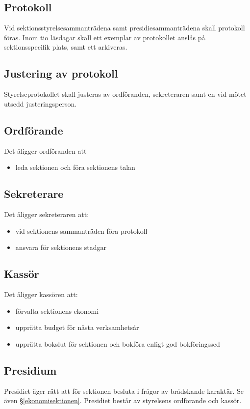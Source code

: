 \documentclass{datateknologsektionen-document}
\begin{document}
\subsection{Protokoll}
Vid sektionsstyrelsesammanträdena samt presidiesammanträdena skall protokoll föras.
Inom tio läsdagar skall ett exemplar av protokollet anslås på sektionsspecifik plats, samt
ett arkiveras.
\subsection{Justering av protokoll}
Styrelseprotokollet skall justeras av ordföranden, sekreteraren samt en vid mötet utsedd
justeringsperson.
\subsection{Ordförande}
Det åligger ordföranden att
\begin{itemize}
  \item leda sektionen och föra sektionens talan
\end{itemize}

\subsection{Sekreterare}
Det åligger sekreteraren att:
\begin{itemize}
  \item vid sektionens sammanträden föra protokoll
  \item ansvara för sektionens stadgar
\end{itemize}

\subsection{Kassör}
Det åligger kassören att:
\begin{itemize}
  \item förvalta sektionens ekonomi
  \item upprätta budget för nästa verksamhetsår
  \item upprätta bokslut för sektionen och bokföra enligt god bokföringssed
\end{itemize}
\subsection{Presidium}
Presidiet äger rätt att för sektionen besluta i frågor av brådskande karaktär. Se även
\S \ref{ekonomisektionen}. Presidiet består av styrelsens ordförande och kassör.
\end{document}
